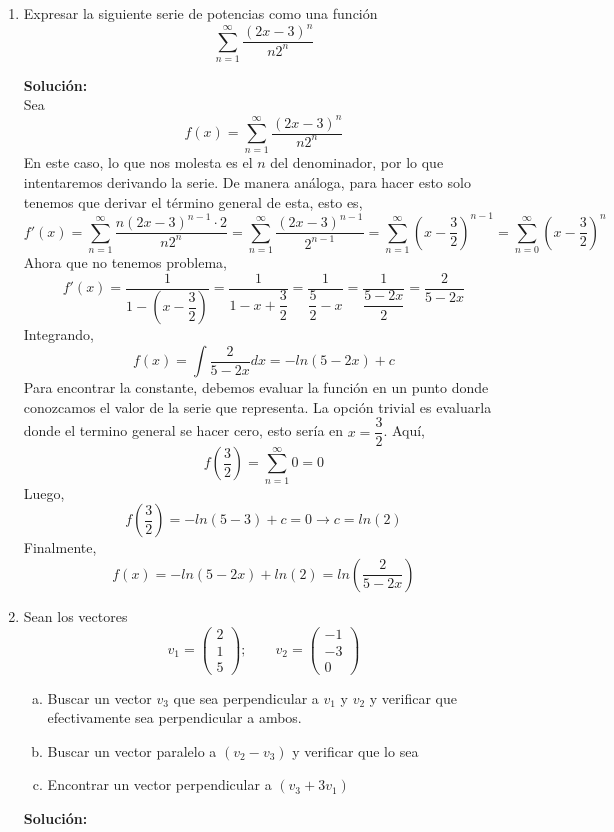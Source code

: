 \documentclass[12pt]{article}
\newenvironment{solucion}
{\begin{mdframed}[backgroundcolor=black!10]
		{\bf Solución:}\\
	}
	{
	\end{mdframed}
}
\newenvironment{preguntas}
{\begin{enumerate}\itemsep12pt
	}
	{
	\end{enumerate}
}
\newcommand{\ra}{\rightarrow}
\begin{document}
\begin{preguntas}
\begin{solucion}
		Finalmente, 
		$$f(x) 
		= \int f'(x) dx
		= \int \sum\limits_{n=0}^{\infty} (-1)^n x^n dx
		= \sum\limits_{n=0}^{\infty} \int (-1)^n x^n dx
		= \sum\limits_{n=0}^{\infty} (-1)^n \dfrac{x^{n+1}}{n+1}$$
\end{solucion}
\item Expresar la siguiente serie de potencias como una función
	$$\sum\limits_{n=1}^\infty \dfrac{(2x-3)^n}{n2^n}$$
\begin{solucion}
Sea 
		$$f(x) = \sum\limits_{n=1}^\infty \dfrac{(2x-3)^n}{n2^n}$$
		En este caso, lo que nos molesta es el $n$ del denominador, por lo que intentaremos derivando la serie. De manera análoga, para hacer esto solo tenemos que derivar el término general de esta, esto es,
		$$f'(x) 
		= \sum\limits_{n=1}^\infty \dfrac{n(2x-3)^{n-1}\cdot 2}{n2^n}
		= \sum\limits_{n=1}^\infty \dfrac{(2x-3)^{n-1}}{2^{n-1}}
		= \sum\limits_{n=1}^\infty \left(x-\dfrac{3}{2}\right)^{n-1}
		= \sum\limits_{n=0}^\infty \left(x-\dfrac{3}{2}\right)^{n}$$
		Ahora que no tenemos problema,
		$$f'(x) 
		= \dfrac{1}{1-\left(x-\dfrac{3}{2}\right)}
		= \dfrac{1}{1-x+\dfrac{3}{2}}
		= \dfrac{1}{\dfrac{5}{2}-x}
		= \dfrac{1}{\dfrac{5-2x}{2}}
		= \dfrac{2}{5-2x}$$
		Integrando,
		$$f(x) 
		= \int \dfrac{2}{5-2x} dx
		= -ln (5-2x) + c$$
		Para encontrar la constante, debemos evaluar la función en un punto donde conozcamos el valor de la serie que representa. La opción trivial es evaluarla donde el termino general se hacer cero, esto sería en $x = \dfrac{3}{2}$. Aquí,
		$$f\left(\dfrac{3}{2}\right) = \sum\limits_{n=1}^\infty 0 = 0$$
		Luego,
		$$f\left(\dfrac{3}{2}\right) = -ln(5-3) + c = 0 \ra c = ln(2)$$
		Finalmente,
		$$f(x) = -ln(5-2x) + ln(2) = ln\left(\dfrac{2}{5-2x}\right)$$
\end{solucion}
\item Sean los vectores
		$$
	v_1 = \begin{pmatrix}
	2\\
	1\\
	5
\end{pmatrix};\qquad
	v_2 = \begin{pmatrix}
	-1\\
	-3\\
	0
\end{pmatrix}$$
\begin{enumerate}[a)]
\item Buscar un vector $v_3$ que sea perpendicular a $v_1$ y $v_2$ y verificar que efectivamente sea perpendicular a ambos.
\item Buscar un vector paralelo a $(v_2-v_3)$ y verificar que lo sea
\item Encontrar un vector perpendicular a $(v_3 + 3v_1)$
\end{enumerate}
\begin{solucion}


\end{solucion}
\end{preguntas}
\end{document}
